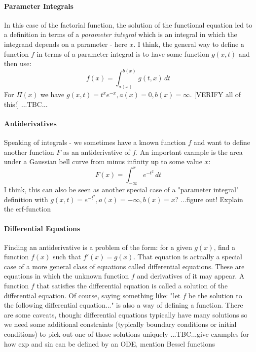 \paragraph{Parameter Integrals}
In this case of the factorial function, the solution of the functional equation led to a definition in terms of a \emph{parameter integral} which is an integral in which the integrand depends on a parameter - here $x$.
I think, the general way to define a function $f$ in terms of a parameter integral is to have some function $g(x,t)$ and then use:
\begin{equation}
 f(x)  = \int_{a(x)}^{b(x)} g(t,x) \, dt
\end{equation}
For $\Pi(x)$ we have $g(x,t) = t^x e^{-x}, a(x) = 0, b(x) = \infty$.
[VERIFY all of this!]
...TBC...

\paragraph{Antiderivatives}
Speaking of integrals - we sometimes have a known function $f$ and want to define another function $F$ as an antiderivative of $f$. An important example is the area under a Gaussian bell curve from minus infinity up to some value $x$:
\begin{equation}
 F(x)  = \int_{-\infty}^{x} e^{-t^2}  \, dt
\end{equation}
I think, this can also be seen as another special case of a "parameter integral" definition with $g(x,t)=e^{-t^2}, a(x)= -\infty, b(x)=x$? ...figure out! Explain the erf-function

\paragraph{Differential Equations}
Finding an antiderivative is a problem of the form: for a given $g(x)$, find a function $f(x)$ such that $f'(x) = g(x)$. That equation is actually a special case of a more general class of equations called differential equations. These are equations in which the unknown function $f$ and derivatives of it may appear. A function $f$ that satisfies the differential equation is called a solution of the differential equation. Of course, saying something like: "let $f$ be the solution to the following differential equation..." is also a way of defining a function. There are some caveats, though: differential equations typically have many solutions so we need some additional constraints (typically boundary conditions or initial conditions) to pick out one of those solutions uniquely ...TBC...give examples for how exp and sin can be defined by an ODE, mention Bessel functions

